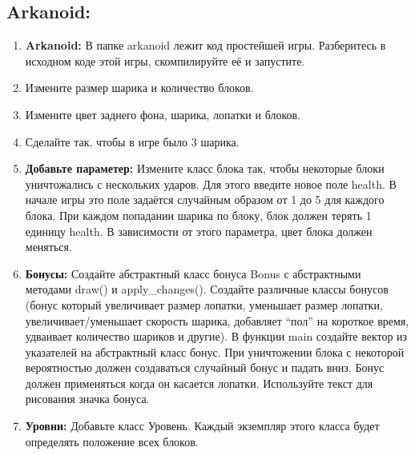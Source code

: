\documentclass{article}
\begin{document}
\subsection*{Arkanoid:}
\begin{enumerate}
\item \textbf{Arkanoid:} В папке arkanoid лежит код простейшей игры. Разберитесь в исходном коде этой игры, скомпилируйте её и запустите.\\
\item \textbf{} Измените размер шарика и количество блоков.\\
\item \textbf{} Измените цвет заднего фона, шарика, лопатки и блоков.\\
\item \textbf{} Сделайте так, чтобы в игре было 3 шарика.\\
\item \textbf{Добавьте параметер:} Измените класс блока так, чтобы некоторые блоки уничтожались с нескольких ударов. Для этого введите новое поле health. В начале игры это поле задаётся случайным образом от 1 до 5 для каждого блока. При каждом попадании шарика по блоку, блок должен терять 1 единицу health. В зависимости от этого параметра, цвет блока должен меняться.\\
\item \textbf{Бонусы:} Создайте абстрактный класс бонуса Bonus с абстрактными методами draw() и apply\_changes(). Создайте различные классы бонусов (бонус который увеличивает размер лопатки, уменьшает размер лопатки, увеличивает/уменьшает скорость шарика, добавляет ``пол'' на короткое время, удваивает количество шариков и другие). В функции main создайте вектор из указателей на абстрактный класс бонус. При уничтожении блока с некоторой вероятностью должен создаваться случайный бонус и падать вниз. Бонус должен применяться когда он касается лопатки. Используйте текст для рисования значка бонуса.
\item \textbf{Уровни:} Добавьте класс Уровень. Каждый экземпляр этого класса будет определять положение всех блоков.
\end{enumerate}
\end{document}

